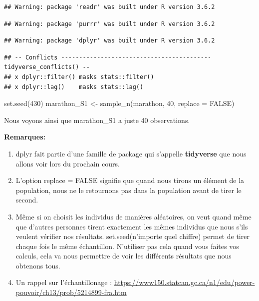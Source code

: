 \documentclass[
]{article}
\newenvironment{Shaded}{\begin{snugshade}}{\end{snugshade}}
\newcommand{\AttributeTok}[1]{\textcolor[rgb]{0.77,0.63,0.00}{#1}}
\newcommand{\ConstantTok}[1]{\textcolor[rgb]{0.00,0.00,0.00}{#1}}
\newcommand{\DecValTok}[1]{\textcolor[rgb]{0.00,0.00,0.81}{#1}}
\newcommand{\FunctionTok}[1]{\textcolor[rgb]{0.00,0.00,0.00}{#1}}
\newcommand{\NormalTok}[1]{#1}
\newcommand{\OtherTok}[1]{\textcolor[rgb]{0.56,0.35,0.01}{#1}}
\providecommand{\tightlist}{%
  \setlength{\itemsep}{0pt}\setlength{\parskip}{0pt}}
\begin{document}
\begin{verbatim}
## Warning: package 'readr' was built under R version 3.6.2
\end{verbatim}

\begin{verbatim}
## Warning: package 'purrr' was built under R version 3.6.2
\end{verbatim}

\begin{verbatim}
## Warning: package 'dplyr' was built under R version 3.6.2
\end{verbatim}

\begin{verbatim}
## -- Conflicts ------------------------------------------ tidyverse_conflicts() --
## x dplyr::filter() masks stats::filter()
## x dplyr::lag()    masks stats::lag()
\end{verbatim}

\begin{Shaded}
\begin{Highlighting}[]
\FunctionTok{set.seed}\NormalTok{(}\DecValTok{430}\NormalTok{)}
\NormalTok{marathon\_S1 }\OtherTok{\textless{}{-}} \FunctionTok{sample\_n}\NormalTok{(marathon, }\DecValTok{40}\NormalTok{, }\AttributeTok{replace =} \ConstantTok{FALSE}\NormalTok{)}
\end{Highlighting}
\end{Shaded}

Nous voyons ainsi que marathon\_S1 a juste 40 observations.

\textbf{Remarques:}

\begin{enumerate}
\def\labelenumi{\arabic{enumi}.}
\tightlist
\item
  dplyr fait partie d'une famille de package qui s'appelle
  \textbf{tidyverse} que nous allons voir lors du prochain cours.
\item
  L'option replace = FALSE signifie que quand nous tirons un élément de
  la population, nous ne le retournons pas dans la population avant de
  tirer le second.
\item
  Même si on choisit les individus de manières aléatoires, on veut quand
  même que d'autres personnes tirent exactement les mêmes individus que
  nous s'ils veulent vérifier nos résultats. set.seed(n'importe quel
  chiffre) permet de tirer chaque fois le même échantillon. N'utiliser
  pas cela quand vous faites vos calculs, cela va nous permettre de voir
  les différents résultats que nous obtenons tous.
\item
  Un rappel sur l'échantillonage :
  \url{https://www150.statcan.gc.ca/n1/edu/power-pouvoir/ch13/prob/5214899-fra.htm}
\end{enumerate}
\end{document}
